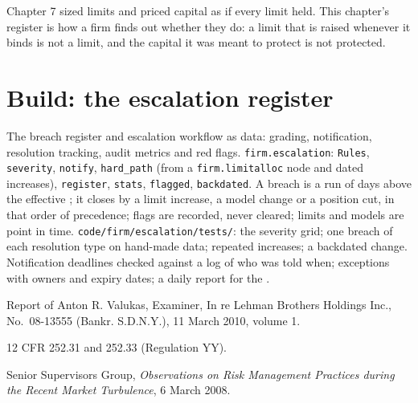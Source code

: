 \begin{remark}\label{rem:fm:the-risk-management-function:ch7}
Chapter 7 sized limits and priced capital as if every limit held. This chapter's register is how a firm finds out whether they do: a limit that is
raised whenever it binds is not a limit, and the capital it was meant to protect is not protected.
\end{remark}

\section{Build: the escalation register}\label{bld:fm:the-risk-management-function:escalation}

\begin{build}
 The breach register and escalation workflow as data: grading, notification, resolution tracking, audit metrics and red flags.
 \texttt{firm.escalation}: \texttt{Rules}, \texttt{severity}, \texttt{notify}, \texttt{hard\_path} (from a
\texttt{firm.limitalloc} node and dated increases), \texttt{register}, \texttt{stats}, \texttt{flagged}, \texttt{backdated}.
 A breach is a run of days above the effective ; it closes by a limit increase, a model change or a position cut, in that
order of precedence; flags are recorded, never cleared; limits and models are point in time.
 \texttt{code/firm/escalation/tests/}: the severity grid; one breach of each resolution type on hand-made data; repeated
increases; a backdated change.
 Notification deadlines checked against a log of who was told when; exceptions with owners and expiry dates; a daily report for the
.
\end{build}

\begin{omsources}
\item Report of Anton R. Valukas, Examiner, In re Lehman Brothers Holdings Inc., No.~08-13555 (Bankr. S.D.N.Y.), 11 March 2010, volume 1.
\item 12 CFR 252.31 and 252.33 (Regulation YY).
\item Senior Supervisors Group, \emph{Observations on Risk Management Practices during the Recent Market Turbulence}, 6 March 2008.
\end{omsources}

